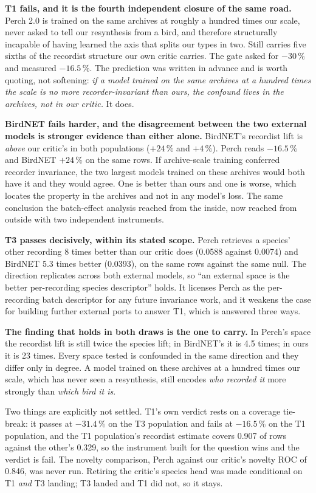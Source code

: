 \documentclass[10pt,twocolumn,a4paper]{article}
\begin{document}
\textbf{T1 fails, and it is the fourth independent closure of the same road.} Perch 2.0 is
trained on the same archives at roughly a hundred times our scale, never asked to tell our
resynthesis from a bird, and therefore structurally incapable of having learned the axis that
splits our types in two. Still carries five sixths of the recordist structure our own
critic carries. The gate asked for $-30\,\%$ and measured $-16.5\,\%$. The prediction was
written in advance and is worth quoting, not softening: \emph{if a model trained on
the same archives at a hundred times the scale is no more recorder-invariant than ours, the
confound lives in the archives, not in our critic.} It does.

\textbf{BirdNET fails harder, and the disagreement between the two external models is
stronger evidence than either alone.} BirdNET's recordist lift is \emph{above} our critic's
in both populations ($+24\,\%$ and $+4\,\%$). Perch reads $-16.5\,\%$ and BirdNET $+24\,\%$
on the same rows. If archive-scale training conferred recorder invariance, the two largest
models trained on these archives would both have it and they would agree. One is better than
ours and one is worse, which locates the property in the archives and not in any model's
loss. The same conclusion the batch-effect analysis reached from the inside, now reached
from outside with two independent instruments.

\textbf{T3 passes decisively, within its stated scope.} Perch retrieves a species' other
recording 8 times better than our critic does (0.0588 against 0.0074) and BirdNET 5.3 times
better (0.0393), on the same rows against the same null. The direction replicates across both
external models, so ``an external space is the better per-recording species descriptor''
holds. It licenses Perch as the per-recording batch descriptor for any future invariance
work, and it weakens the case for building further external ports to answer T1, which is
answered three ways.

\textbf{The finding that holds in both draws is the one to carry.} In Perch's space the
recordist lift is still twice the species lift; in BirdNET's it is 4.5 times; in ours it is
23 times. Every space tested is confounded in the same direction and they differ only in
degree. A model trained on these archives at a hundred times our scale, which has never seen
a resynthesis, still encodes \emph{who recorded it} more strongly than \emph{which bird it
is}.

Two things are explicitly not settled. T1's own verdict rests on a coverage tie-break: it
passes at $-31.4\,\%$ on the T3 population and fails at $-16.5\,\%$ on the T1 population,
and the T1 population's recordist estimate covers 0.907 of rows against the other's 0.329, so
the instrument built for the question wins and the verdict is fail. The novelty
comparison, Perch against our critic's novelty ROC of 0.846, was never run. Retiring
the critic's species head was made conditional on T1 \emph{and} T3 landing; T3 landed and T1
did not, so it stays.
\end{document}
